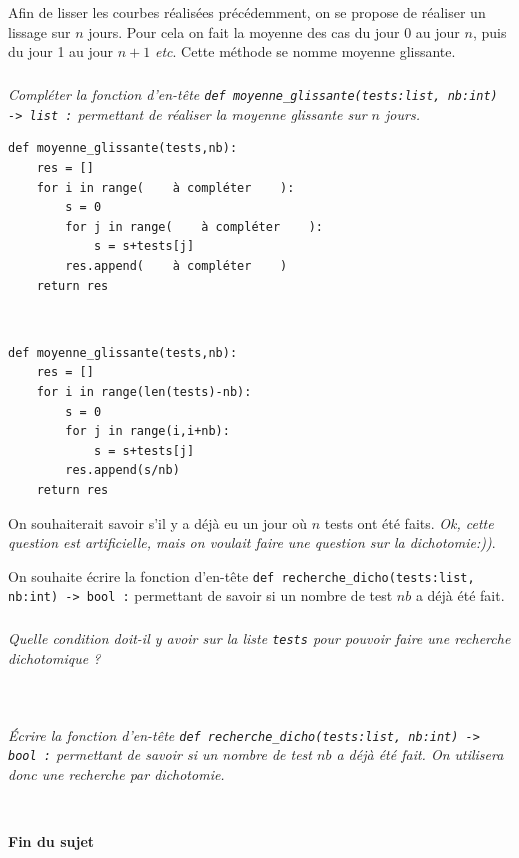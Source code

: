 \documentclass[10pt,fleqn]{article} %
\begin{document}
Afin de lisser les courbes réalisées précédemment, on se propose de réaliser un lissage sur $n$ jours. Pour cela on fait la moyenne des cas du jour 0 au jour $n$, puis du jour 1 au jour $n+1$ \textit{etc}. Cette méthode se nomme moyenne glissante. 

\subparagraph{}
\textit{Compléter la fonction d’en-tête \texttt{def moyenne\_glissante(tests:list, nb:int) -> list :} permettant de réaliser la moyenne glissante sur $n$ jours. }
\begin{lstlisting}
def moyenne_glissante(tests,nb):
    res = []
    for i in range(    à compléter    ):
        s = 0
        for j in range(    à compléter    ):
            s = s+tests[j]
        res.append(    à compléter    )
    return res
\end{lstlisting}


\ifprof
\begin{corrige}~\\
\begin{lstlisting}
def moyenne_glissante(tests,nb):
    res = []
    for i in range(len(tests)-nb):
        s = 0
        for j in range(i,i+nb):
            s = s+tests[j]
        res.append(s/nb)
    return res
\end{lstlisting}
\end{corrige}
\else
\fi


On souhaiterait savoir s'il y a déjà eu un jour où $n$ tests ont été faits. \textit{Ok, cette question est artificielle, mais on voulait faire une question sur la dichotomie:))}.

On souhaite écrire la fonction d’en-tête \texttt{def recherche\_dicho(tests:list, nb:int) -> bool :} permettant de savoir si un nombre de test $nb$ a déjà été fait. 

\subparagraph{}
\textit{Quelle condition doit-il y avoir sur la liste \texttt{tests} pour pouvoir faire une recherche dichotomique ?}
\ifprof
\begin{corrige}~\\

\end{corrige}
\else
\fi


\subparagraph{}
\textit{Écrire la fonction d’en-tête \texttt{def recherche\_dicho(tests:list, nb:int) -> bool :} permettant de savoir si un nombre de test $nb$ a déjà été fait. On utilisera donc une recherche par dichotomie.}
\ifprof
\begin{corrige}~\\

\end{corrige}
\else
\fi



\ifprof
\else
\vfill
\begin{center}
\textbf{	Fin du sujet	}
\end{center}
\vfill
\fi
\end{document}
